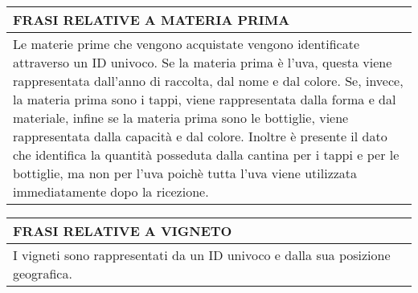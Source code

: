 \begin{center}
	\vspace{0.5cm}

	\begin{tabular}{P{16cm}}
		\toprule
		 \textbf {\large {FRASI RELATIVE A MATERIA PRIMA}}                                                                                                                                                                                                                                                                                                                                                                                                                                                                                                                \\
		\midrule
		Le materie prime che vengono acquistate vengono identificate attraverso un ID univoco. Se la materia prima è l'uva, questa viene rappresentata dall'anno di raccolta, dal nome e dal colore. Se, invece, la materia prima sono i tappi, viene rappresentata dalla forma e dal materiale, infine se la materia prima sono le bottiglie, viene rappresentata dalla capacità e dal colore. Inoltre è presente il dato che identifica la quantità posseduta dalla cantina per i tappi e per le bottiglie, ma non per l'uva poichè tutta l'uva viene utilizzata immediatamente dopo la ricezione. \\
		\bottomrule
	\end{tabular}

	\vspace{0.5cm}

	\begin{tabular}{P{16cm}}
		\toprule
		 \textbf {\large {FRASI RELATIVE A VIGNETO}}     \\
		\midrule
		I vigneti sono rappresentati da un ID univoco e dalla sua posizione geografica. \\
		\bottomrule
	\end{tabular}

	\vspace{0.5cm}


\end{center}
